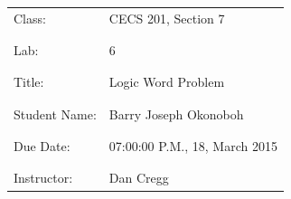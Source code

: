 \documentclass[9pt]{article}
\begin{document}
\vspace*{\fill}
\begin{center}
{\Huge \begin{tabular}{@{}ll@{}}
   Class: & CECS 201, Section 7 \\ \\ \\
   Lab: & 6 \\ \\ \\
   Title: & Logic Word Problem \\ \\ \\
   Student Name: & Barry Joseph Okonoboh \\ \\ \\
   Due Date: & 07:00:00 P.M., 18, March 2015 \\ \\ \\
   Instructor: & Dan Cregg
\end{tabular}}
\end{center}
\vspace*{\fill}
\newpage
\end{document}
